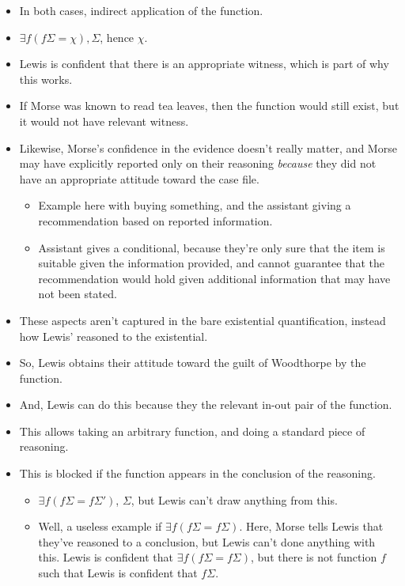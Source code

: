 \documentclass[10pt]{article}
\begin{document}
\begin{itemize}
\item In both cases, indirect application of the function.
\item \(\exists f(f\Sigma = \chi), \Sigma\), hence \(\chi\).
\item Lewis is confident that there is an appropriate witness, which is part of why this works.
\item If Morse was known to read tea leaves, then the function would still exist, but it would not have relevant witness.
\item Likewise, Morse's confidence in the evidence doesn't really matter, and Morse may have explicitly reported only on their reasoning \emph{because} they did not have an appropriate attitude toward the case file.
  \begin{itemize}
  \item Example here with buying something, and the assistant giving a recommendation based on reported information.
  \item Assistant gives a conditional, because they're only sure that the item is suitable given the information provided, and cannot guarantee that the recommendation would hold given additional information that may have not been stated.
  \end{itemize}
\item These aspects aren't captured in the bare existential quantification, instead how Lewis' reasoned to the existential.
\item So, Lewis obtains their attitude toward the guilt of Woodthorpe by the function.
\item And, Lewis can do this because they the relevant in-out pair of the function.
\item This allows taking an arbitrary function, and doing a standard piece of reasoning.
\item This is blocked if the function appears in the conclusion of the reasoning.
  \begin{itemize}
  \item \(\exists f(f\Sigma = f\Sigma')\), \(\Sigma\), but Lewis can't draw anything from this.
  \item Well, a useless example if \(\exists f(f\Sigma = f\Sigma)\).
    Here, Morse tells Lewis that they've reasoned to a conclusion, but Lewis can't done anything with this.
    Lewis is confident that \(\exists f(f\Sigma = f\Sigma)\), but there is not function \(f\) such that Lewis is confident that \(f\Sigma\).
  \end{itemize}
\end{itemize}
\end{document}
